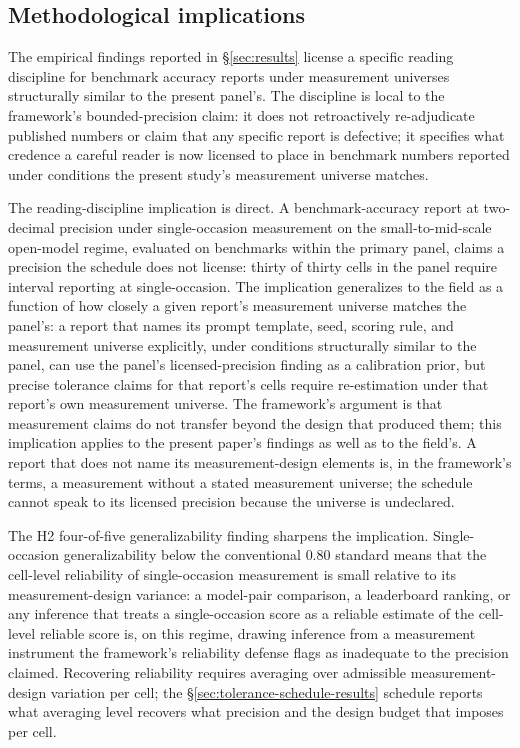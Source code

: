 \documentclass[11pt]{article}
\begin{document}
\subsection{Methodological implications}
\label{sec:methodological-implications}

The empirical findings reported in §\ref{sec:results} license a specific reading discipline for benchmark accuracy reports under measurement universes structurally similar to the present panel's. The discipline is local to the framework's bounded-precision claim: it does not retroactively re-adjudicate published numbers or claim that any specific report is defective; it specifies what credence a careful reader is now licensed to place in benchmark numbers reported under conditions the present study's measurement universe matches.

The reading-discipline implication is direct. A benchmark-accuracy report at two-decimal precision under single-occasion measurement on the small-to-mid-scale open-model regime, evaluated on benchmarks within the primary panel, claims a precision the schedule does not license: thirty of thirty cells in the panel require interval reporting at single-occasion. The implication generalizes to the field as a function of how closely a given report's measurement universe matches the panel's: a report that names its prompt template, seed, scoring rule, and measurement universe explicitly, under conditions structurally similar to the panel, can use the panel's licensed-precision finding as a calibration prior, but precise tolerance claims for that report's cells require re-estimation under that report's own measurement universe. The framework's argument is that measurement claims do not transfer beyond the design that produced them; this implication applies to the present paper's findings as well as to the field's. A report that does not name its measurement-design elements is, in the framework's terms, a measurement without a stated measurement universe; the schedule cannot speak to its licensed precision because the universe is undeclared.

The H2 four-of-five generalizability finding sharpens the implication. Single-occasion generalizability below the conventional $0.80$ standard means that the cell-level reliability of single-occasion measurement is small relative to its measurement-design variance: a model-pair comparison, a leaderboard ranking, or any inference that treats a single-occasion score as a reliable estimate of the cell-level reliable score is, on this regime, drawing inference from a measurement instrument the framework's reliability defense flags as inadequate to the precision claimed. Recovering reliability requires averaging over admissible measurement-design variation per cell; the §\ref{sec:tolerance-schedule-results} schedule reports what averaging level recovers what precision and the design budget that imposes per cell.
\end{document}
